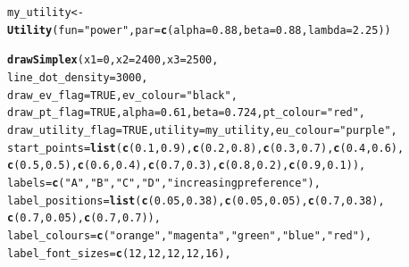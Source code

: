 \documentclass{article}\usepackage[]{graphicx}\usepackage[]{color}
\makeatletter
\newcommand{\hlnum}[1]{\textcolor[rgb]{0.686,0.059,0.569}{#1}}%
\newcommand{\hlstr}[1]{\textcolor[rgb]{0.192,0.494,0.8}{#1}}%
\newcommand{\hlstd}[1]{\textcolor[rgb]{0.345,0.345,0.345}{#1}}%
\newcommand{\hlkwb}[1]{\textcolor[rgb]{0.69,0.353,0.396}{#1}}%
\newcommand{\hlkwc}[1]{\textcolor[rgb]{0.333,0.667,0.333}{#1}}%
\newcommand{\hlkwd}[1]{\textcolor[rgb]{0.737,0.353,0.396}{\textbf{#1}}}%
\newenvironment{kframe}{%
 \def\at@end@of@kframe{}%
 \ifinner\ifhmode%
  \def\at@end@of@kframe{\end{minipage}}%
  \begin{minipage}{\columnwidth}%
 \fi\fi%
 \def\FrameCommand##1{\hskip\@totalleftmargin \hskip-\fboxsep
 \colorbox{shadecolor}{##1}\hskip-\fboxsep
     \hskip-\linewidth \hskip-\@totalleftmargin \hskip\columnwidth}%
 \MakeFramed {\advance\hsize-\width
   \@totalleftmargin\z@ \linewidth\hsize
   \@setminipage}}%
 {\par\unskip\endMakeFramed%
 \at@end@of@kframe}
\newenvironment{knitrout}{}{} %
\makeatother
\begin{document}
\begin{knitrout}
\color{fgcolor}\begin{kframe}
\begin{alltt}
\hlstd{my_utility} \hlkwb{<-} \hlkwd{Utility}\hlstd{(}\hlkwc{fun}\hlstd{=}\hlstr{"power"}\hlstd{,} \hlkwc{par}\hlstd{=}\hlkwd{c}\hlstd{(}\hlkwc{alpha}\hlstd{=}\hlnum{0.88}\hlstd{,} \hlkwc{beta}\hlstd{=}\hlnum{0.88}\hlstd{,} \hlkwc{lambda}\hlstd{=}\hlnum{2.25}\hlstd{))}

\hlkwd{drawSimplex}\hlstd{(}\hlkwc{x1}\hlstd{=}\hlnum{0}\hlstd{,} \hlkwc{x2}\hlstd{=}\hlnum{2400}\hlstd{,} \hlkwc{x3}\hlstd{=}\hlnum{2500}\hlstd{,}
        \hlkwc{line_dot_density}\hlstd{=}\hlnum{3000}\hlstd{,}
        \hlkwc{draw_ev_flag}\hlstd{=}\hlnum{TRUE}\hlstd{,} \hlkwc{ev_colour}\hlstd{=}\hlstr{"black"}\hlstd{,}
        \hlkwc{draw_pt_flag}\hlstd{=}\hlnum{TRUE}\hlstd{,} \hlkwc{alpha}\hlstd{=}\hlnum{0.61}\hlstd{,} \hlkwc{beta}\hlstd{=}\hlnum{0.724}\hlstd{,} \hlkwc{pt_colour}\hlstd{=}\hlstr{"red"}\hlstd{,}
        \hlkwc{draw_utility_flag}\hlstd{=}\hlnum{TRUE}\hlstd{,} \hlkwc{utility}\hlstd{=my_utility,} \hlkwc{eu_colour}\hlstd{=}\hlstr{"purple"}\hlstd{,}
        \hlkwc{start_points}\hlstd{=}\hlkwd{list}\hlstd{(}\hlkwd{c}\hlstd{(}\hlnum{0.1}\hlstd{,}\hlnum{0.9}\hlstd{),}\hlkwd{c}\hlstd{(}\hlnum{0.2}\hlstd{,}\hlnum{0.8}\hlstd{),}\hlkwd{c}\hlstd{(}\hlnum{0.3}\hlstd{,}\hlnum{0.7}\hlstd{),}\hlkwd{c}\hlstd{(}\hlnum{0.4}\hlstd{,}\hlnum{0.6}\hlstd{),}
                \hlkwd{c}\hlstd{(}\hlnum{0.5}\hlstd{,}\hlnum{0.5}\hlstd{),}\hlkwd{c}\hlstd{(}\hlnum{0.6}\hlstd{,}\hlnum{0.4}\hlstd{),}\hlkwd{c}\hlstd{(}\hlnum{0.7}\hlstd{,}\hlnum{0.3}\hlstd{),}\hlkwd{c}\hlstd{(}\hlnum{0.8}\hlstd{,}\hlnum{0.2}\hlstd{),}\hlkwd{c}\hlstd{(}\hlnum{0.9}\hlstd{,}\hlnum{0.1}\hlstd{)),}
        \hlkwc{labels}\hlstd{=}\hlkwd{c}\hlstd{(}\hlstr{"A"}\hlstd{,}\hlstr{"B"}\hlstd{,}\hlstr{"C"}\hlstd{,}\hlstr{"D"}\hlstd{,}\hlstr{"increasing preference"}\hlstd{),}
        \hlkwc{label_positions}\hlstd{=}\hlkwd{list}\hlstd{(}\hlkwd{c}\hlstd{(}\hlnum{0.05}\hlstd{,}\hlnum{0.38}\hlstd{),}\hlkwd{c}\hlstd{(}\hlnum{0.05}\hlstd{,}\hlnum{0.05}\hlstd{),}\hlkwd{c}\hlstd{(}\hlnum{0.7}\hlstd{,}\hlnum{0.38}\hlstd{),}
                \hlkwd{c}\hlstd{(}\hlnum{0.7}\hlstd{,}\hlnum{0.05}\hlstd{),}\hlkwd{c}\hlstd{(}\hlnum{0.7}\hlstd{,}\hlnum{0.7}\hlstd{)),}
        \hlkwc{label_colours}\hlstd{=}\hlkwd{c}\hlstd{(}\hlstr{"orange"}\hlstd{,}\hlstr{"magenta"}\hlstd{,}\hlstr{"green"}\hlstd{,}\hlstr{"blue"}\hlstd{,}\hlstr{"red"}\hlstd{),}
        \hlkwc{label_font_sizes}\hlstd{=}\hlkwd{c}\hlstd{(}\hlnum{12}\hlstd{,}\hlnum{12}\hlstd{,}\hlnum{12}\hlstd{,}\hlnum{12}\hlstd{,}\hlnum{16}\hlstd{),}

\end{alltt}
\end{kframe}
\end{knitrout}
\end{document}
